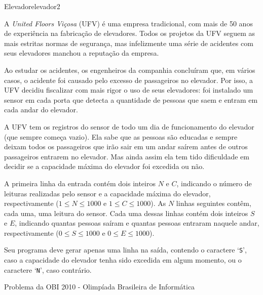 \documentclass[12pt,a4paper,oneside]{article}
\begin{document}
\begin{problem}{Elevador}{elevador}{2}
 
A \textit{United Floors Viçosa} (UFV) é uma empresa tradicional, com mais de 50 anos de experiência na fabricação de elevadores. Todos os projetos da UFV seguem as
mais estritas normas de segurança, mas infelizmente uma série de acidentes com seus elevadores manchou a reputação da empresa.

Ao estudar os acidentes, os engenheiros da companhia concluíram que, em vários casos, o acidente foi causado pelo excesso de passageiros no elevador. Por isso, a
UFV decidiu fiscalizar com mais rigor o uso de seus elevadores: foi instalado um sensor em cada porta que detecta a quantidade de pessoas que saem e entram
em cada andar do elevador.

A UFV tem os registros do sensor de todo um dia de funcionamento do elevador (que sempre começa vazio). Ela sabe que as pessoas são educadas e sempre deixam todos os passageiros que irão sair em um andar saírem antes de outros passageiros entrarem no elevador. Mas ainda assim ela tem tido dificuldade em decidir se a capacidade máxima do elevador foi excedida ou não.

%

\InputFile

A primeira linha da entrada contém dois inteiros $N$ e $C$, indicando o número de leituras realizadas pelo sensor e a capacidade máxima do elevador, respectivamente ($1 \leq N \leq 1000$ e $1 \leq C \leq 1000$). As $N$ linhas seguintes contêm, cada uma, uma leitura do sensor. Cada uma dessas linhas contém dois inteiros $S$ e $E$, indicando quantas pessoas saíram e quantas pessoas entraram naquele andar, respectivamente ($0 \leq S \leq 1000$ e $0 \leq E \leq 1000$).


\OutputFile

Seu programa deve gerar apenas uma linha na saída, contendo o caractere `\texttt{S}', caso a capacidade do elevador tenha sido excedida em algum momento, ou o caractere `\texttt{N}', caso contrário.

\Example

\begin{example}
%
\end{example}

\begin{example}
%
\end{example}

\begin{example}
%
\end{example}

\footnotesize Problema da OBI 2010 - Olimpíada Brasileira de Informática

\end{problem}
\end{document}

